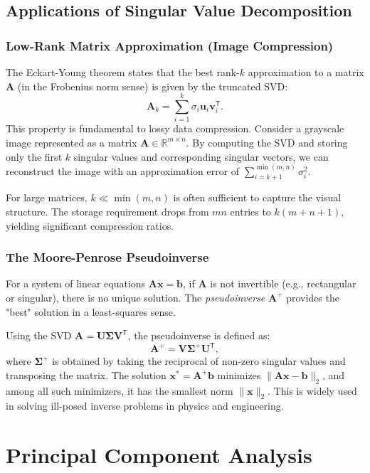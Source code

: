 \subsection{Applications of Singular Value Decomposition}

\subsubsection{Low-Rank Matrix Approximation (Image Compression)}
The Eckart-Young theorem states that the best rank-$k$ approximation to a matrix $\mathbf{A}$ (in the Frobenius norm sense) is given by the truncated SVD:
\[
  \mathbf{A}_k = \sum_{i=1}^{k} \sigma_i \mathbf{u}_i \mathbf{v}_i^{\mathsf{T}}.
\]
This property is fundamental to lossy data compression. Consider a grayscale image represented as a matrix $\mathbf{A} \in \mathbb{R}^{m \times n}$. By computing the SVD and storing only the first $k$ singular values and corresponding singular vectors, we can reconstruct the image with an approximation error of $\sum_{i=k+1}^{\min(m,n)} \sigma_i^2$.

For large matrices, $k \ll \min(m,n)$ is often sufficient to capture the visual structure. The storage requirement drops from $mn$ entries to $k(m+n+1)$, yielding significant compression ratios.

\subsubsection{The Moore-Penrose Pseudoinverse}
For a system of linear equations $\mathbf{A}\mathbf{x} = \mathbf{b}$, if $\mathbf{A}$ is not invertible (e.g., rectangular or singular), there is no unique solution. The \emph{pseudoinverse} $\mathbf{A}^+$ provides the "best" solution in a least-squares sense.

Using the SVD $\mathbf{A} = \mathbf{U}\mathbf{\Sigma}\mathbf{V}^{\mathsf{T}}$, the pseudoinverse is defined as:
\[
  \mathbf{A}^+ = \mathbf{V}\mathbf{\Sigma}^+\mathbf{U}^{\mathsf{T}},
\]
where $\mathbf{\Sigma}^+$ is obtained by taking the reciprocal of non-zero singular values and transposing the matrix. The solution $\mathbf{x}^* = \mathbf{A}^+\mathbf{b}$ minimizes $\|\mathbf{A}\mathbf{x} - \mathbf{b}\|_2$, and among all such minimizers, it has the smallest norm $\|\mathbf{x}\|_2$. This is widely used in solving ill-posed inverse problems in physics and engineering.

\section{Principal Component Analysis}

